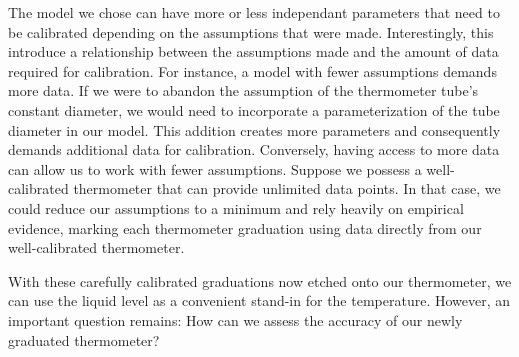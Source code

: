 \begin{bibunit}
  The model we chose can have more or less independant parameters that need to be calibrated depending on the assumptions that were made.
  Interestingly, this introduce a relationship between the assumptions made and the amount of data required for calibration. For instance, a model with fewer assumptions demands more data. If we were to abandon the assumption of the thermometer tube's constant diameter, we would need to incorporate a parameterization of the tube diameter in our model. This addition creates more parameters and consequently demands additional data for calibration. Conversely, having access to more data can allow us to work with fewer assumptions. Suppose we possess a well-calibrated thermometer that can provide unlimited data points. In that case, we could reduce our assumptions to a minimum and rely heavily on empirical evidence, marking each thermometer graduation using data directly from our well-calibrated thermometer.

With these carefully calibrated graduations now etched onto our thermometer, we can use the liquid level as a convenient stand-in for the temperature. However, an important question remains: How can we assess the accuracy of our newly graduated thermometer?

\begin{figure}[h]
\centering
\begin{tabular}{ccc}


\end{tabular}
\end{figure}
\end{bibunit}

